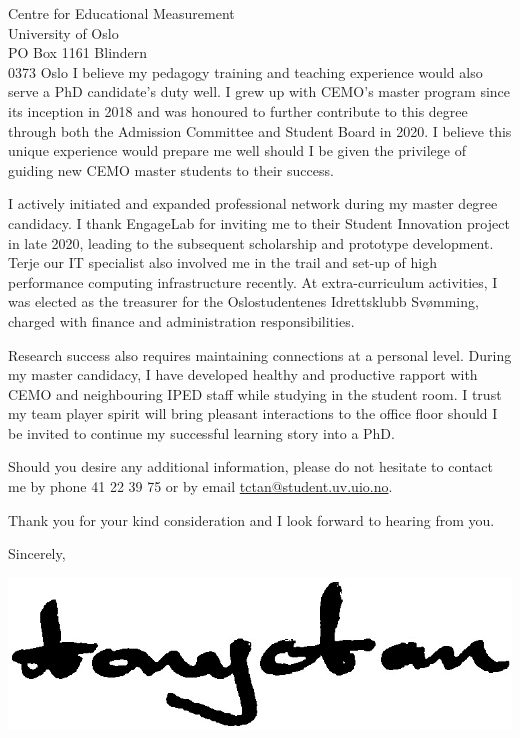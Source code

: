 \documentclass[a4paper,11pt]{letter} %
\begin{document}
\begin{letter}{Centre for Educational Measurement \\ University of Oslo \\ PO Box 1161 Blindern \\ 0373 Oslo}
I believe my pedagogy training and teaching experience would also serve a PhD candidate's duty well. I grew up with CEMO's master program since its inception in 2018 and was honoured to further contribute to this degree through both the Admission Committee and Student Board in 2020. I believe this unique experience would prepare me well should I be given the privilege of guiding new CEMO master students to their success.

I actively initiated and expanded professional network during my master degree candidacy. I thank EngageLab for inviting me to their Student Innovation project in late 2020, leading to the subsequent scholarship and prototype development. Terje our IT specialist also involved me in the trail and set-up of high performance computing infrastructure recently. At extra-curriculum activities, I was elected as the treasurer for the Oslostudentenes Idrettsklubb Svømming, charged with finance and administration responsibilities.

Research success also requires maintaining connections at a personal level. During my master candidacy, I have developed healthy and productive rapport with CEMO and neighbouring IPED staff while studying in the student room. I trust my team player spirit will bring pleasant interactions to the office floor should I be invited to continue my successful learning story into a PhD.

Should you desire any additional information, please do not hesitate to contact me by phone 41 22 39 75 or by email \href{tctan@student.uv.uio.no}{tctan@student.uv.uio.no}.

Thank you for your kind consideration and I look forward to hearing from you.

\vspace{2\parskip} %

Sincerely,

\includegraphics[scale=0.15]{signature.jpg}

\vspace{-7\parskip} %

\closing{\ }




\end{letter}
\end{document}

